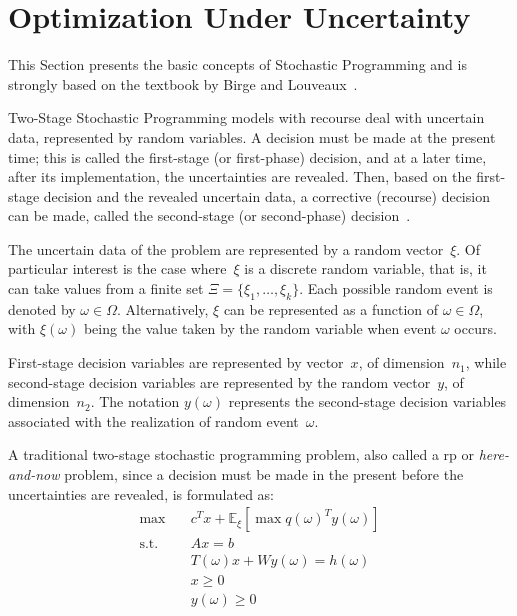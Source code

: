 \section{Optimization Under Uncertainty}\label{sec:optimization-under-uncertainty}

This Section presents the basic concepts of Stochastic Programming and is
strongly based on the textbook by Birge and Louveaux~\cite{birge:2011}.

Two-Stage Stochastic Programming models with recourse deal with uncertain data,
represented by random variables. A decision must be made at the present time;
this is called the first-stage (or first-phase) decision, and at a later time,
after its implementation, the uncertainties are revealed. Then, based on the
first-stage decision and the revealed uncertain data, a corrective (recourse)
decision can be made, called the second-stage (or second-phase)
decision~\cite{birge:2011}.

The uncertain data of the problem are represented by a random vector~$\xi$. Of
particular interest is the case where~$\xi$ is a discrete random variable, that
is, it can take values from a finite set $\Xi = \{\xi_{1}, \ldots, \xi_{k}\}$.
Each possible random event is denoted by $\omega \in \Omega$. Alternatively, $\xi$
can be represented as a function of $\omega \in \Omega$, with $\xi(\omega)$
being the value taken by the random variable when event $\omega$ occurs.

First-stage decision variables are represented by vector~$x$, of
dimension~$n_{1}$, while second-stage decision variables are represented by the
random vector~$y$, of dimension~$n_{2}$. The notation $y(\omega)$ represents the
second-stage decision variables associated with the realization of random
event~$\omega$.

A traditional two-stage stochastic programming problem, also called a \gls{rp}
or \emph{here-and-now} problem, since a decision must be made in the present
before the uncertainties are revealed, is formulated as:
\begin{align}
	\max \quad        & c^{T} x + \mathbb{E}_{\xi} \left[ \max q(\omega)^{T} y(\omega) \right] \nonumber \\
	\text{s.t.} \quad & A x = b \nonumber                                                                \\
	                  & T(\omega)x + W y(\omega) = h(\omega) \nonumber                                   \\
	                  & x \geq 0 \nonumber                                                               \\
	                  & y(\omega) \geq 0
	\label{eq:rp}
\end{align}


